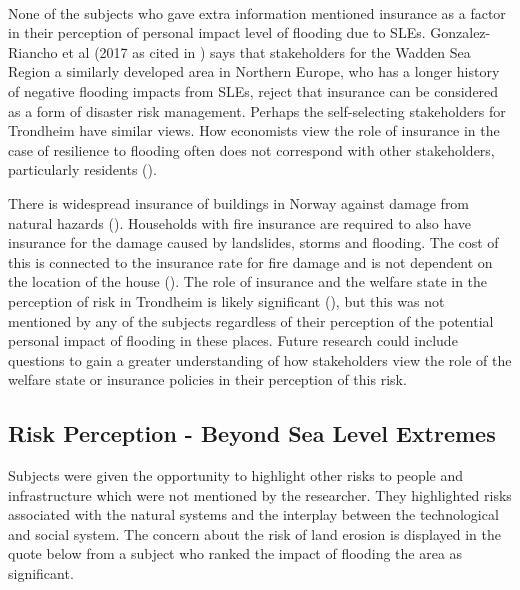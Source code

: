 \paragraph{}
None of the subjects who gave extra information mentioned insurance as a factor in their perception of personal impact level of flooding due to SLEs. Gonzalez-Riancho et al (2017 as cited in \cite{gerkensmeier_governing_2018}) says that stakeholders for the Wadden Sea Region a similarly developed area in Northern Europe, who has a longer history of negative flooding impacts from SLEs, reject that insurance can be considered as a form of disaster risk management. Perhaps the self-selecting stakeholders for Trondheim have similar views. How economists view the role of insurance in the case of resilience to flooding often does not correspond with other stakeholders, particularly residents (\cite{gerkensmeier_governing_2018}).



There is widespread insurance of buildings in Norway against damage from natural hazards (\cite{lujala_role_2020}). Households with fire insurance are required to also have insurance for the damage caused by landslides, storms and flooding. The cost of this is connected to the insurance rate for fire damage and is not dependent on the location of the house (\cite{lujala_role_2020}). The role of insurance and the welfare state in the perception of risk in Trondheim is likely significant (\cite{lujala_role_2020}), but this was not mentioned by any of the subjects regardless of their perception of the potential personal impact of flooding in these places. Future research could include questions to gain a greater understanding of how stakeholders view the role of the welfare state or insurance policies in their perception of this risk. 

\subsection{Risk Perception - Beyond Sea Level Extremes}
Subjects were given the opportunity to highlight other risks to people and infrastructure which were not mentioned by the researcher. They highlighted risks associated with the natural systems and the interplay between the technological and social system. The concern about the risk of land erosion is displayed in the quote below from a subject who ranked the impact of flooding the area as significant.

